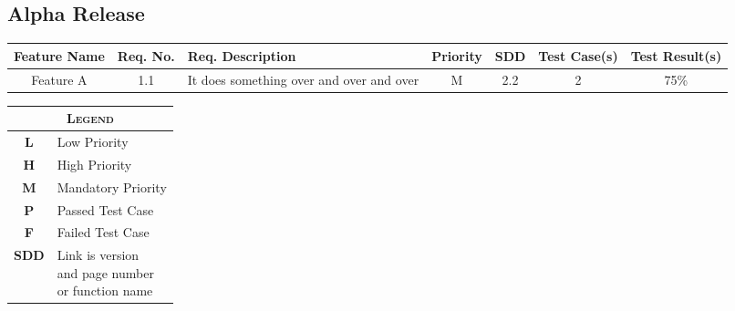 \documentclass[twoside,letterpaper]{article}
\begin{document}
\subsection{Alpha Release}
\begin{minipage}{\linewidth}
\centering
{}
\begin{tabularx}{\textwidth}{*{2}{c}X*{4}{c}}\toprule[1.5pt] %

\bf Feature Name & \bf Req. No. & \bf Req. \newline Description & \bf Priority & \bf SDD & \bf Test Case(s) & \bf Test Result(s) \\ \midrule[1.0pt]

Feature A & 1.1 & It does something over and over and over & M & 2.2 & 2 & 75\% \\

\bottomrule[1.5pt]
\end{tabularx}\par

\bigskip
\raggedleft
\begin{tabular}{c l} %
\multicolumn{2}{c}{\textsc{Legend}} \\ \midrule[0.5pt]
\textsc{\textbf{L}}   & Low Priority\\
\textsc{\textbf{H}}   & High Priority\\
\textsc{\textbf{M}}	  & Mandatory Priority\\
\textsc{\textbf{P}}   & Passed Test Case\\
\textsc{\textbf{F}}   & Failed Test Case\\
\textsc{\textbf{SDD}} & \parbox{3cm}{\vspace{.25em}
						Link is version\\
						and page number\\
						or function name}
\end{tabular}
\end{minipage}
\end{document}
